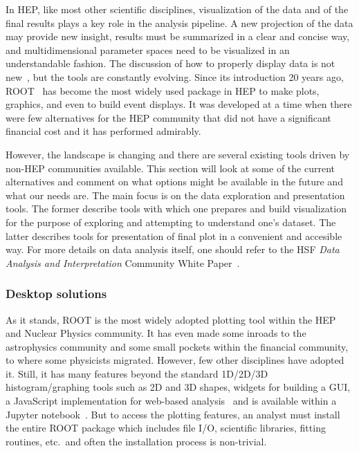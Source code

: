 \documentclass[12pt,a4paper]{article}
\begin{document}
In HEP, like most other scientific disciplines, visualization of the data and of the final results plays a key role in the
analysis pipeline. A new projection of the data may provide new insight, results must be summarized in a
clear and concise way, and multidimensional parameter spaces need to be visualized in an understandable fashion. The discussion
of how to properly display data is not new~\cite{Tufte1986}, but the tools are constantly evolving. Since its introduction 20 years ago,
ROOT~\cite{Root1997} has become the most widely used package in HEP to make plots, graphics, and even to build event displays.
It was developed at a time when there were few alternatives for the HEP community that did not have a significant
financial cost and it has performed admirably.

However, the landscape is changing and there are several existing tools driven by non-HEP communities available. This section will look at
some of the current alternatives and comment on what options might be available in the future and what our needs are. The main focus is
on the data exploration and presentation tools. The former describe tools with which one prepares and build visualization for the purpose
of exploring and attempting to understand one's dataset. The latter describes tools for presentation of final plot in a convenient and accesible way.
For more details on data analysis itself, one should refer to the HSF \emph{Data Analysis and Interpretation} Community White Paper~\cite{HSF-CWP-2017-05}.

\hypertarget{stats-desktop}{%
\subsubsection{Desktop solutions}\label{stats-desktop}}

As it stands, ROOT is the most widely adopted plotting tool within the HEP and Nuclear Physics community.
It has even made some inroads to the astrophysics community and some small pockets within the financial community,
to where some physicists migrated. However, few other disciplines have adopted it. Still, it has many features beyond
the standard 1D/2D/3D histogram/graphing tools such as 2D and 3D shapes, widgets for building a GUI, a JavaScript
implementation for web-based analysis~\cite{rootjs} and is available within a Jupyter notebook~\cite{JupyterNotebook}. But to
access the plotting features, an analyst must install the entire ROOT package which includes file I/O, scientific
libraries, fitting routines, etc.\ and often the installation process is non-trivial.
\end{document}
